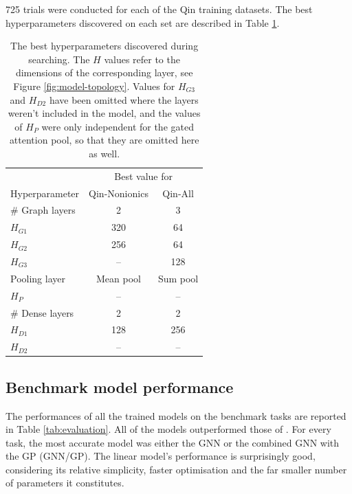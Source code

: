 \num{725} trials were conducted for each of the Qin training datasets. The best
hyperparameters discovered on each set are described in Table \ref{tab:hb-hps}.

\begin{table}
    \centering
    \caption{The best hyperparameters discovered during searching. The $H$
        values refer to the dimensions of the corresponding layer, see Figure
        \ref{fig:model-topology}. Values for $H_{G3}$ and $H_{D2}$ have been
        omitted where the layers weren't included in the model, and the values
        of $H_P$ were only independent for the gated attention pool, so that
        they are omitted here as well.}
    \label{tab:hb-hps}
    \begin{tabular}{@{}lcc@{}} \toprule
                        & \multicolumn{2}{c}{Best value for}            \\\cmidrule(l){2-3}
        Hyperparameter  & Qin-Nonionics                      & Qin-All  \\\midrule
        \# Graph layers & 2                                  & 3        \\
        $H_{G1}$        & 320                                & 64       \\
        $H_{G2}$        & 256                                & 64       \\
        $H_{G3}$        & --                                 & 128      \\
        Pooling layer   & Mean pool                          & Sum pool \\
        $H_P$           & --                                 & --       \\
        \# Dense layers & 2                                  & 2        \\
        $H_{D1}$        & 128                                & 256      \\
        $H_{D2}$        & --                                 & --       \\\bottomrule
    \end{tabular}
\end{table}

\subsection{Benchmark model performance}

The performances of all the trained models on the benchmark tasks are reported in Table \ref{tab:evaluation}. All of the models outperformed those of \citeqin. For every task, the most accurate model was either the GNN or the combined GNN with the GP (GNN/GP). The linear model's performance is surprisingly good, considering its relative simplicity, faster optimisation and the far smaller number of parameters it constitutes.

